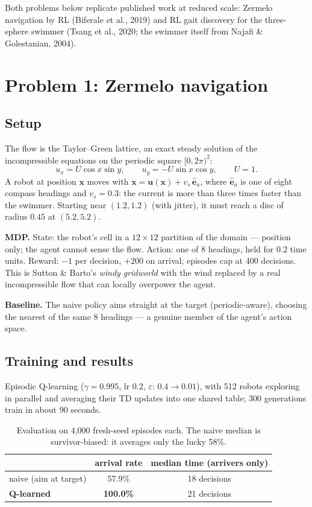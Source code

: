 \documentclass[11pt]{article}
\begin{document}
Both problems below replicate published work at reduced scale: Zermelo navigation by RL
(Biferale et al., 2019) and RL gait discovery for the three-sphere swimmer (Tsang et al.,
2020; the swimmer itself from Najafi \& Golestanian, 2004).

\section{Problem 1: Zermelo navigation}

\subsection{Setup}

The flow is the Taylor--Green lattice, an exact steady solution of the incompressible
equations on the periodic square $[0, 2\pi)^2$:
\begin{equation}
u_x = U\cos x \sin y, \qquad u_y = -U\sin x \cos y, \qquad U = 1.
\end{equation}
A robot at position $\mathbf{x}$ moves with $\dot{\mathbf{x}} = \mathbf{u}(\mathbf{x}) +
v_s\,\hat{\mathbf{e}}_a$, where $\hat{\mathbf{e}}_a$ is one of eight compass headings and
$v_s = 0.3$: the current is more than three times faster than the swimmer. Starting near
$(1.2, 1.2)$ (with jitter), it must reach a disc of radius $0.45$ at $(5.2, 5.2)$.

\textbf{MDP.} State: the robot's cell in a $12\times12$ partition of the domain ---
position only; the agent cannot sense the flow. Action: one of 8 headings, held for
$0.2$ time units. Reward: $-1$ per decision, $+200$ on arrival; episodes cap at 400
decisions. This is Sutton \& Barto's \emph{windy gridworld} with the wind replaced by a
real incompressible flow that can locally overpower the agent.

\textbf{Baseline.} The naive policy aims straight at the target (periodic-aware), choosing
the nearest of the same 8 headings --- a genuine member of the agent's action space.

\subsection{Training and results}

Episodic Q-learning ($\gamma = 0.995$, lr $0.2$, $\varepsilon$: $0.4 \to 0.01$), with 512
robots exploring in parallel and averaging their TD updates into one shared table; 300
generations train in about 90 seconds.

\begin{table}[h]
\centering
\begin{tabular}{lcc}
\toprule
 & arrival rate & median time (arrivers only) \\
\midrule
naive (aim at target) & 57.9\% & 18 decisions \\
\textbf{Q-learned} & \textbf{100.0\%} & 21 decisions \\
\bottomrule
\end{tabular}
\caption{Evaluation on 4{,}000 fresh-seed episodes each. The naive median is
survivor-biased: it averages only the lucky 58\%.}
\end{table}
\end{document}
